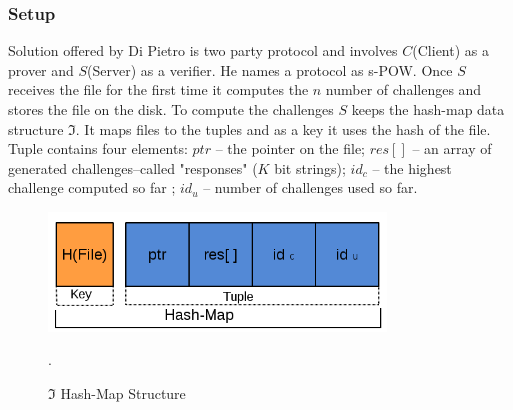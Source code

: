 \documentclass[12pt]{article}
\begin{document}
\subsubsection{Setup}
\label{subsub:setup2}


Solution offered by Di Pietro is two party protocol and involves $C$(Client) as a prover and $S$(Server) as a verifier. He names a protocol as s-POW. Once $S$ receives the file for the first time it computes the $n$ number of challenges and stores the file on the disk. To compute the challenges $S$ keeps the hash-map data structure $\Im$. It maps files to the tuples and as a key it uses the hash of the file. Tuple contains four elements: $ptr$ -- the pointer on the file; $res []$ -- an array of generated challenges--called "responses" ($K$ bit strings); $id_c$ -- the highest challenge computed so far ; $id_u$ -- number of challenges used so far.

\begin{figure}[ht] 
\begin{center}
\includegraphics[width=0.8\textwidth]{Di_Pietro_Hash_Map}
\caption{$\Im$ Hash-Map Structure }
\label{fig:Di_Pietro_Hash_Map} .
\end{center}
\end{figure}
\end{document}
